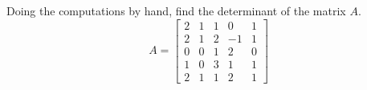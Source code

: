 Doing the computations by hand, find the determinant of the matrix $A$. 
%
\begin{equation*}
A= 
\begin{bmatrix}
2 & 1 & 1 & 0  & 1\\
2 & 1 & 2 & -1 & 1\\
0 & 0 & 1 & 2 & 0\\
1 & 0 & 3 & 1 & 1\\
2 & 1 & 1 & 2 & 1
\end{bmatrix}
\end{equation*}